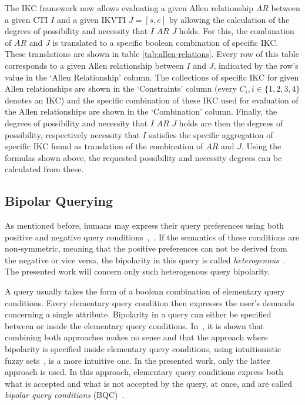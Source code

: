 \documentclass[runningheads,a4paper]{llncs}
\begin{document}
The IKC framework now allows evaluating a given Allen relationship $AR$ between a given CTI $I$ and a given IKVTI $J = \left[s, e\right]$ by allowing the calculation of the degrees of possibility and necessity that $I$ $AR$ $J$ holds. For this, the combination of $AR$ and $J$ is translated to a specific boolean combination of specific IKC. These translations are shown in table \ref{tab:allen-relations}. Every row of this table corresponds to a given Allen relationship between $I$ and $J$, indicated by the row's value in the `Allen Relationship' column. The collections of specific IKC for given Allen relationships are shown in the `Constraints' column (every $C_i, i \in \{1, 2, 3, 4\}$ denotes an IKC) and the specific combination of these IKC used for evaluation of the Allen relationships are shown in the `Combination' column. Finally, the degrees of possibility and necessity that $I$ $AR$ $J$ holds are then the degrees of possibility, respectively necessity that $I$ satisfies the specific aggregation of specific IKC found as translation of the combination of $AR$ and $J$. Using the formulas shown above, the requested possibility and necessity degrees can be calculated from these.

\subsection{Bipolar Querying}
As mentioned before, humans may express their query preferences using both positive and negative query conditions~\cite{DeTre2010ieeetfs},~\cite{Matthe2011ijis}. If the semantics of these conditions are non-symmetric, meaning that the positive preferences can not be derived from the negative or vice versa, the bipolarity in this query is called \emph{heterogenous}~\cite{Matthe2011ijis}. The presented work will concern only such heterogenous query bipolarity.

A query usually takes the form of a boolean combination of elementary query conditions. Every elementary query condition then expresses the user's demands concerning a single attribute. Bipolarity in a query can either be specified between or inside the elementary query conditions. In~\cite{Matthe2011ijis}, it is shown that combining both approaches makes no sense and that the approach where bipolarity is specified inside elementary query conditions, using intuitionistic fuzzy sets~\cite{Atanassov1986fss}, is a more intuitive one. In the presented work, only the latter approach is used. In this approach, elementary query conditions express both what is accepted and what is not accepted by the query, at once, and are called \emph{bipolar query conditions} (BQC)~\cite{Matthe2011ijis}.
\end{document}
